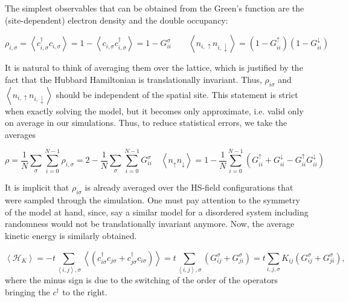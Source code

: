 The simplest observables that can be obtained from the Green's function are the (site-dependent) electron density and the double occupancy:

\begin{equation}
\rho_{i, \sigma} = \left\langle c_{i,\sigma}^\dagger c_{i,\sigma} \right\rangle = 1 - \left\langle c_{i,\sigma} c_{i,\sigma}^\dagger \right\rangle = 1 - G_{ii}^\sigma  \quad\quad \left\langle n_{i,\uparrow} n_{i,\downarrow} \right\rangle = ( 1 - G_{ii}^\uparrow ) ( 1 - G_{ii}^\downarrow )
\end{equation}

It is natural to think of averaging them over the lattice, which is justified by the fact that the Hubbard Hamiltonian is translationally invariant.
Thus, $\rho_{i\sigma}$ and $\left\langle n_{i,\uparrow} n_{i,\downarrow} \right\rangle$ should be independent of the spatial site.
This statement is strict when exactly solving the model, but it becomes only approximate, i.e. valid only on average in our simulations.
Thus, to reduce statistical errors, we take the averages

\begin{equation}
\rho = \frac{1}{N} \sum_\sigma \sum_{i=0}^{N-1} \rho_{i, \sigma} = 2 - \frac{1}{N} \sum_\sigma \sum_{i=0}^{N-1} G_{ii}^\sigma \quad \left\langle n_\uparrow n_\downarrow \right\rangle = 1 - \frac{1}{N} \sum_{i=0}^{N-1} ( G_{ii}^\uparrow + G_{ii}^\downarrow - G_{ii}^\uparrow G_{ii}^\downarrow )
\end{equation}

It is implicit that $\rho_{i\sigma}$ is already averaged over the HS-field configurations that were sampled through the simulation.
One must pay attention to the symmetry of the model at hand, since, say a similar model for a disordered system including randomness would not be translationally invariant anymore.
Now, the average kinetic energy is similarly obtained.

\begin{equation}
\left\langle \mathcal{H}_K \right\rangle = - t  \sum_{\left\langle i, j \right\rangle , \sigma} \left\langle ( c_{i\sigma}^\dagger c_{j\sigma} + c_{j\sigma}^\dagger c_{i\sigma} ) \right\rangle = t \sum_{\left\langle i, j \right\rangle , \sigma} ( G_{ij}^\sigma + G_{ji}^\sigma ) = t \sum_{ i, j , \sigma} K_{ij} ( G_{ij}^\sigma + G_{ji}^\sigma )  ,
\end{equation}
where the minus sign is due to the switching of the order of the operators bringing the $c^\dagger$ to the right.

